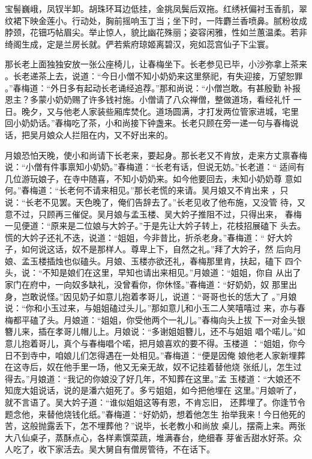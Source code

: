 宝髻巍峨，凤钗半卸。胡珠环耳边低挂，金挑凤鬓后双拖。红绣袄偏衬玉香肌，翠
纹裙下映金莲小。行动处，胸前摇响玉丁当；坐下时，一阵麝兰香喷鼻。腻粉妆成
脖颈，花钿巧帖眉尖。举止惊人，貌比幽花殊丽；姿容闲雅，性如兰蕙温柔。若非
绮阁生成，定是兰房长就。俨若紫府琼姬离碧汉，宛如蕊宫仙子下尘寰。

那长老上面独独安放一张公座椅儿，让春梅坐下。长老参见已毕，小沙弥拿上茶来
。长老递茶上去，说道：“今日小僧不知小奶奶来这里祭祀，有失迎接，万望恕罪
。”春梅道：“外日多有起动长老诵经追荐。”那和尚说：“小僧岂敢。有甚殷勤
补报恩主？多蒙小奶奶赐了许多钱衬施。小僧请了八众禅僧，整做道场，看经礼忏
一日。晚夕，又与他老人家装些厢库焚化。道场圆满，才打发两位管家进城，宅里
回小奶奶话。”春梅吃了茶，小和尚接下钟盏来。长老只顾在旁一递一句与春梅说
话，把吴月娘众人拦阻在内，又不好出来的。

月娘恐怕天晚，使小和尚请下长老来，要起身。那长老又不肯放，走来方丈禀春梅
说：“小僧有件事禀知小奶奶。”春梅道：“长老有话，但说无妨。”长老道：“
适间有几位游玩娘子，在寺中随喜，不知小奶奶来。如今他要回去，未知小奶奶尊
意如何。”春梅道：“长老何不请来相见。”那长老慌的来请。吴月娘又不肯出来
，只说：“长老不见罢。天色晚了，俺们告辞去了。”长老见收了他布施，又没管
待，又意不过，只顾再三催促。吴月娘与孟玉楼、吴大妗子推阻不过，只得出来，
春梅一见便道：“原来是二位娘与大妗子。”于是先让大妗子转上，花枝招展磕下
头去。慌的大妗子还礼不迭，说道：“姐姐，今非昔比，折杀老身。”春梅道：“
好大妗子，如何说这话，奴不是那样人。尊卑上下，自然之礼。”拜了大妗子，然
后向月娘、孟玉楼插烛也似磕头。月娘、玉楼亦欲还礼，春梅那里肯，扶起，磕下
四个头，说：“不知是娘们在这里，早知也请出来相见。”月娘道：“姐姐，你自
从出了家门在府中，一向奴多缺礼，没曾看你，你休怪。”春梅道：“好奶奶，奴
那里出身，岂敢说怪。”因见奶子如意儿抱着孝哥儿，说道：“哥哥也长的恁大了
。”月娘说：“你和小玉过来，与姐姐磕过头儿。”那如意儿和小玉二人笑嘻嘻过
来，亦与春梅都平磕了头。月娘道：“姐姐，你受他两个一礼儿。”春梅向头上拔
下一对金头银簪儿来，插在孝哥儿帽儿上。月娘说：“多谢姐姐簪儿，还不与姐姐
唱个喏儿。”如意儿抱着哥儿，真个与春梅唱个喏，把月娘喜欢的要不得。玉楼道
：“姐姐，你今日不到寺中，咱娘儿们怎得遇在一处相见。”春梅道：“便是因俺
娘他老人家新埋葬在这寺后，奴在他手里一场，他又无亲无故，奴不记挂着替他烧
张纸儿，怎生过得去。”月娘道：“我记的你娘没了好几年，不知葬在这里。”孟
玉楼道：“大娘还不知庞大姐说话，说的是潘六姐死了。多亏姐姐，如今把他埋在
这里。”月娘听了，就不言语了。吴大妗子道：“谁似姐姐这等有恩，不肯忘旧，
还葬埋了。你逢节令题念他，来替他烧钱化纸。”春梅道：“好奶奶，想着他怎生
抬举我来！今日他死的苦，这般抛露丢下，怎不埋葬他？”说毕，长老教小和尚放
桌儿，摆斋上来。两张大八仙桌子，蒸酥点心，各样素馔菜蔬，堆满春台，绝细春
芽雀舌甜水好茶。众人吃了，收下家活去。吴大舅自有僧房管待，不在话下。

